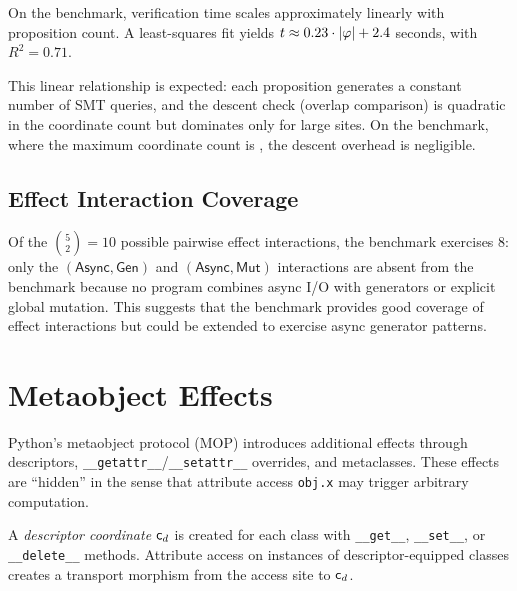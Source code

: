 \documentclass[11pt]{article}
\newcommand{\Mut}{\mathsf{Mut}}          %
\newcommand{\Async}{\mathsf{Async}}      %
\newcommand{\Gen}{\mathsf{Gen}}          %
\begin{document}
\begin{proposition}\label{prop:linear}
On the benchmark, verification time scales approximately linearly
with proposition count.  A least-squares fit yields
$t \approx 0.23 \cdot |\varphi| + 2.4$ seconds, with $R^2 = 0.71$.
\end{proposition}

This linear relationship is expected: each proposition generates a
constant number of SMT queries, and the descent check (overlap
comparison) is quadratic in the coordinate count but dominates only
for large sites.  On the benchmark, where the maximum coordinate
count is \expCoordsMax{}, the descent overhead is negligible.

\subsection{Effect Interaction Coverage}

Of the $\binom{5}{2} = 10$ possible pairwise effect interactions,
the benchmark exercises 8: only the $(\Async, \Gen)$ and
$(\Async, \Mut)$ interactions are absent from the benchmark because
no program combines async I/O with generators or explicit global
mutation.  This suggests that the benchmark provides good coverage
of effect interactions but could be extended to exercise async
generator patterns.

\section{Metaobject Effects}\label{sec:metaobject}

Python's metaobject protocol (MOP) introduces additional effects
through descriptors, \texttt{\_\_getattr\_\_}/\texttt{\_\_setattr\_\_}
overrides, and metaclasses.  These effects are ``hidden'' in the sense
that attribute access \texttt{obj.x} may trigger arbitrary computation.

\begin{definition}\label{def:descriptor}
A \emph{descriptor coordinate} $\mathsf{c}_d$ is created for each
class with \texttt{\_\_get\_\_}, \texttt{\_\_set\_\_}, or
\texttt{\_\_delete\_\_} methods.  Attribute access on instances
of descriptor-equipped classes creates a transport morphism from
the access site to $\mathsf{c}_d$.
\end{definition}
\end{document}
